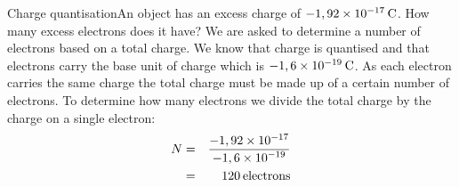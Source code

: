\begin{wex}{Charge quantisation}{An object has an excess charge of $-1,92\ensuremath{\times}{10}^{-17}\phantom{\rule{2pt}{0ex}}\text{C}$. How many excess electrons does it have?}{
We are asked to determine a number of electrons based on a total charge. We know that charge is quantised and that electrons carry the base unit of charge which is $-1,6\ensuremath{\times}{10}^{-19}\phantom{\rule{2pt}{0ex}}\text{C}$.
 As each electron carries the same charge the total charge must be made up of a certain number of electrons. To determine how many electrons we divide the total charge by the charge on a single electron:\label{m38781*id1166032483813}\nopagebreak\noindent{}
    \begin{eqnarray*}
N&=&\frac{-1,92\ensuremath{\times}{10}^{-17}}{-1,6\ensuremath{\times}{10}^{-19}}\\ 
\phantom{x}&=&120\phantom{\rule{2pt}{0ex}}\text{electrons}
      \end{eqnarray*}}\end{wex}

